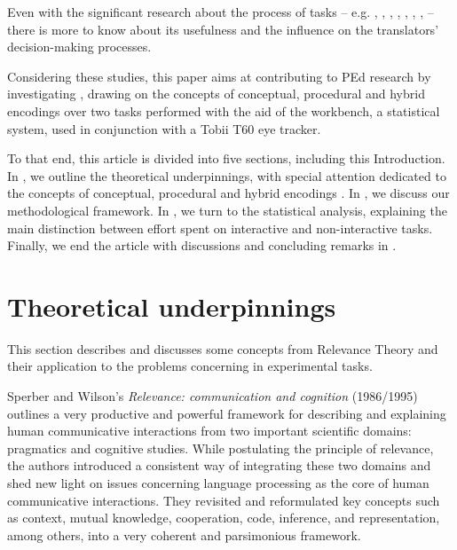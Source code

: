 \documentclass[output=paper]{langsci/langscibook}
\begin{document}
Even with the significant research about the process of  tasks -- e.g. \citet{Guerberof2012}, \citet{obrien2006}, \citet{obrien2009}, \citet{Depraetere2010}, \citet{Plitt2010}, \citet{Sousa2011}, \citet{specia2009}, \citet{specia2011} -- there is more to know about its usefulness and the influence on the translators' decision-making processes. 



Considering these studies, this paper aims at contributing to PEd research by investigating , drawing on the concepts of conceptual, procedural and hybrid encodings over two  tasks performed with the aid of the  workbench, a statistical  system, used in conjunction with a Tobii T60 eye tracker.



To that end, this article is divided into five sections, including this Introduction. In , we outline the theoretical underpinnings, with special attention dedicated to the concepts of conceptual, procedural and hybrid encodings \citep{moeschler1998, Wilson2011, alves2013}. In , we discuss our methodological framework. In , we turn to the statistical analysis, explaining the main distinction between effort spent on interactive and non-interactive  tasks. Finally, we end the article with discussions and concluding remarks in .


\section{Theoretical underpinnings\label{alves:sec:TheoreticalUnderpinnings}}

This section describes and discusses some concepts from Relevance Theory \citep{Sperber1986second} and their application to the problems concerning  in  experimental tasks. 


Sperber and Wilson's \textit{Relevance: communication and cognition} (1986/1995) outlines a very productive and powerful framework for describing and explaining human communicative interactions from two important scientific domains: pragmatics and cognitive studies. While postulating the principle of relevance, the authors introduced a consistent way of integrating these two domains and shed new light on issues concerning language processing as the core of human communicative interactions. They revisited and reformulated key concepts such as context, mutual knowledge, cooperation, code, inference, and representation, among others, into a very coherent and parsimonious framework.
\end{document}
